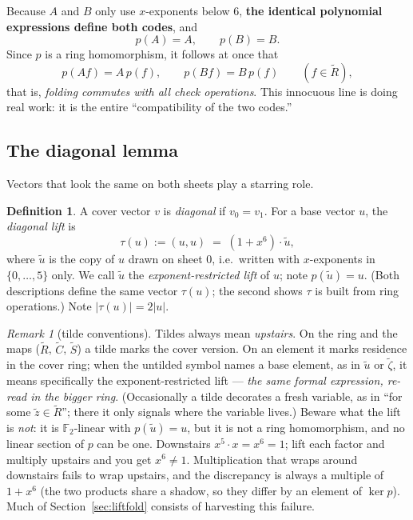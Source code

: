 \documentclass[11pt]{article}
\theoremstyle{plain}
\theoremstyle{definition}
\newtheorem{definition}[theorem]{Definition}
\theoremstyle{remark}
\newtheorem{remark}[theorem]{Remark}
\newcommand{\F}{\mathbb{F}}
\newcommand{\Rcov}{\widetilde{R}}
\newcommand{\wt}[1]{\lvert #1\rvert}
\begin{document}
Because $A$ and $B$ only use $x$-exponents below 6, \textbf{the identical
polynomial expressions define both codes}, and
\[
p(A) = A, \qquad p(B) = B.
\]
Since $p$ is a ring homomorphism, it follows at once that
\begin{equation}\label{eq:chainmap}
p(A f) = A\, p(f), \qquad p(B f) = B\, p(f) \qquad (f \in \Rcov),
\end{equation}
that is, \emph{folding commutes with all check operations}. This innocuous
line is doing real work: it is the entire ``compatibility of the two codes.''

\subsection{The diagonal lemma}

Vectors that look the same on both sheets play a starring role.

\begin{definition}
A cover vector $v$ is \emph{diagonal} if $v_0 = v_1$. For a base vector $u$,
the \emph{diagonal lift} is
\[
\tau(u) := (u, u) \;=\; (1 + x^6)\cdot \widetilde u,
\]
where $\widetilde u$ is the copy of $u$ drawn on sheet 0, i.e.\ written with
$x$-exponents in $\{0,\dots,5\}$ only. We call $\widetilde u$ the
\emph{exponent-restricted lift} of $u$; note $p(\widetilde u) = u$. (Both
descriptions define the same vector $\tau(u)$; the second shows $\tau$ is
built from ring operations.) Note $\wt{\tau(u)} = 2\wt{u}$.
\end{definition}

\begin{remark}[tilde conventions]\label{rem:tilde}
Tildes always mean \emph{upstairs}. On the ring and the maps ($\Rcov$,
$\widetilde C$, $\widetilde S$) a tilde marks the cover version. On an
element it marks residence in the cover ring; when the untilded symbol names
a base element, as in $\widetilde u$ or $\widetilde\zeta$, it means
specifically the exponent-restricted lift --- \emph{the same formal
expression, re-read in the bigger ring}. (Occasionally a tilde decorates a
fresh variable, as in ``for some $\widetilde z \in \Rcov$''; there it only
signals where the variable lives.) Beware what the lift is \emph{not}: it is
$\F_2$-linear with $p(\widetilde u) = u$, but it is not a ring homomorphism,
and no linear section of $p$ can be one. Downstairs $x^5 \cdot x = x^6 = 1$;
lift each factor and multiply upstairs and you get $x^6 \neq 1$.
Multiplication that wraps around downstairs fails to wrap upstairs, and the
discrepancy is always a multiple of $1 + x^6$ (the two products share a
shadow, so they differ by an element of $\ker p$). Much of
Section~\ref{sec:liftfold} consists of harvesting this failure.
\end{remark}
\end{document}
